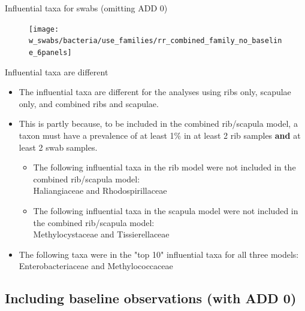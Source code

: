 \documentclass{beamer}
\begin{document}
\begin{frame}{Influential taxa for swabs (omitting ADD 0)}

  \begin{center}
    \begin{figure}
      \texttt{[image: w\_swabs/bacteria/use\_families/rr\_combined\_family\_no\_baseline\_6panels]}
    \end{figure}
  \end{center}

\end{frame}


\begin{frame}{Influential taxa are different}
  
  \begin{itemize}
    \item The influential taxa are different for the analyses using ribs only,
    scapulae only, and combined ribs and scapulae.
    \item This is partly because, to be included in the combined rib/scapula
    model, a taxon must have a prevalence of at least 1\% in at least 2 rib
    samples \textbf{and} at least 2 swab samples.
    \begin{itemize}
      \item The following influential taxa in the rib model were not included in
    the combined rib/scapula model:\\
    Haliangiaceae and Rhodospirillaceae
    \item The following influential taxa in the scapula model were not included
    in the combined rib/scapula model:\\
    Methylocystaceae and Tissierellaceae
    \end{itemize}
    \item The following taxa were in the "top 10" influential taxa for all
    three models:\\
    Enterobacteriaceae and Methylococcaceae
  \end{itemize}

\end{frame}



\subsection{Including baseline observations (with ADD 0)}
\end{document}

